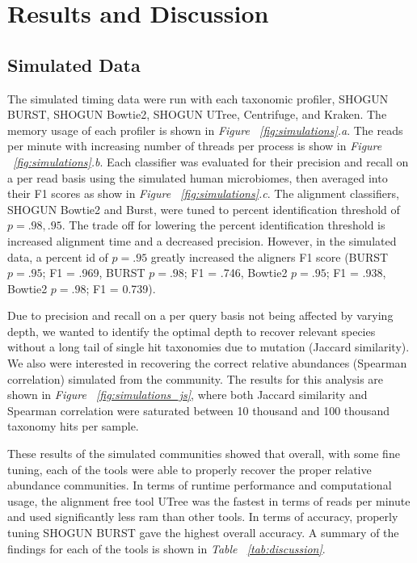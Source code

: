 \section{Results and Discussion}

\subsection{Simulated Data}

The simulated timing data were run with each taxonomic profiler, SHOGUN BURST, SHOGUN Bowtie2, SHOGUN UTree, Centrifuge, and Kraken. The memory usage of each profiler is shown in \textit{Figure ~\ref{fig:simulations}.a}. The reads per minute with increasing number of threads per process is show in \textit{Figure ~\ref{fig:simulations}.b}. Each classifier was evaluated for their precision and recall on a per read basis using the simulated human microbiomes, then averaged into their F1 scores as show in \textit{Figure ~\ref{fig:simulations}.c}. The alignment classifiers, SHOGUN Bowtie2 and Burst, were tuned to percent identification threshold of $p=.98, .95$. The trade off for lowering the percent identification threshold is increased alignment time and a decreased precision. However, in the simulated data, a percent id of $p=.95$ greatly increased the aligners F1 score (BURST $p = .95$; F1 = .969, BURST $p = .98$; F1 = .746, Bowtie2 $p = .95$; F1 = .938, Bowtie2 $p = .98$; F1 = 0.739).

Due to precision and recall on a per query basis not being affected by varying depth, we wanted to identify the optimal depth to recover relevant species without a long tail of single hit taxonomies due to mutation (Jaccard similarity). We also were interested in recovering the correct relative abundances (Spearman correlation) simulated from the community. The results for this analysis are shown in \textit{Figure ~\ref{fig:simulations_js}}, where both Jaccard similarity and Spearman correlation were saturated between 10 thousand and 100 thousand taxonomy hits per sample.

These results of the simulated communities showed that overall, with some fine tuning, each of the tools were able to properly recover the proper relative abundance communities. In terms of runtime performance and computational usage, the alignment free tool UTree was the fastest in terms of reads per minute and used significantly less ram than other tools. In terms of accuracy, properly tuning SHOGUN BURST gave the highest overall accuracy. A summary of the findings for each of the tools is shown in \textit{Table ~\ref{tab:discussion}}.

